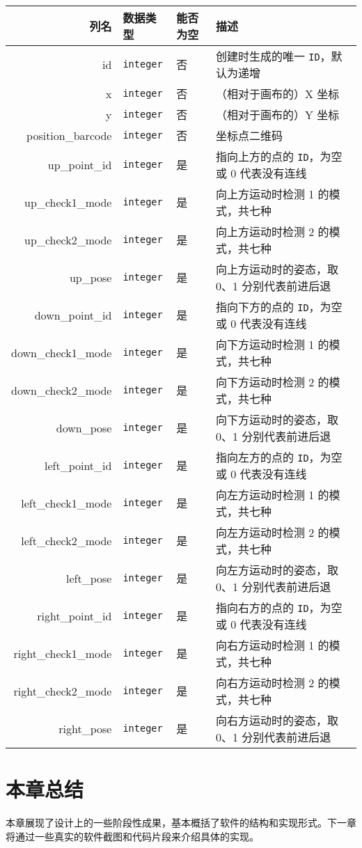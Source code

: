 \begin{longtabu}to \textwidth{rllX}
  \toprule
  列名 & 数据类型 & 能否为空 & 描述 \\
  \midrule
  \endhead
  \bottomrule
  \endfoot
  id & \texttt{integer} & 否 & 创建时生成的唯一 \texttt{ID}，默认为递增 \\
  x & \texttt{integer} & 否 & （相对于画布的）X 坐标 \\
  y & \texttt{integer} & 否 & （相对于画布的）Y 坐标 \\
  position\_barcode & \texttt{integer} & 否 & 坐标点二维码 \\
  up\_point\_id & \texttt{integer} & 是 & 指向上方的点的 \texttt{ID}，为空或 0 代表没有连线 \\
  up\_check1\_mode & \texttt{integer} & 是 & 向上方运动时检测 1 的模式，共七种 \\
  up\_check2\_mode & \texttt{integer} & 是 & 向上方运动时检测 2 的模式，共七种 \\
  up\_pose & \texttt{integer} & 是 & 向上方运动时的姿态，取 0、1 分别代表前进后退 \\
  down\_point\_id & \texttt{integer} & 是 & 指向下方的点的 \texttt{ID}，为空或 0 代表没有连线 \\
  down\_check1\_mode & \texttt{integer} & 是 & 向下方运动时检测 1 的模式，共七种 \\
  down\_check2\_mode & \texttt{integer} & 是 & 向下方运动时检测 2 的模式，共七种 \\
  down\_pose & \texttt{integer} & 是 & 向下方运动时的姿态，取 0、1 分别代表前进后退 \\
  left\_point\_id & \texttt{integer} & 是 & 指向左方的点的 \texttt{ID}，为空或 0 代表没有连线 \\
  left\_check1\_mode & \texttt{integer} & 是 & 向左方运动时检测 1 的模式，共七种 \\
  left\_check2\_mode & \texttt{integer} & 是 & 向左方运动时检测 2 的模式，共七种 \\
  left\_pose & \texttt{integer} & 是 & 向左方运动时的姿态，取 0、1 分别代表前进后退 \\
  right\_point\_id & \texttt{integer} & 是 & 指向右方的点的 \texttt{ID}，为空或 0 代表没有连线 \\
  right\_check1\_mode & \texttt{integer} & 是 & 向右方运动时检测 1 的模式，共七种 \\
  right\_check2\_mode & \texttt{integer} & 是 & 向右方运动时检测 2 的模式，共七种 \\
  right\_pose & \texttt{integer} & 是 & 向右方运动时的姿态，取 0、1 分别代表前进后退
\end{longtabu}

\section{本章总结}

本章展现了设计上的一些阶段性成果，基本概括了软件的结构和实现形式。下一章将通过一些真实的软件截图和代码片段来介绍具体的实现。

